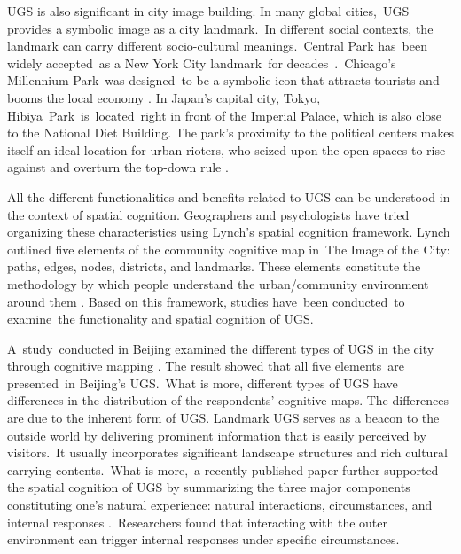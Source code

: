 UGS is also significant in city image building. In many global cities, UGS provides a symbolic image as a city landmark. In different social contexts, the landmark can carry different socio-cultural meanings. Central Park has been widely accepted as a New York City landmark for decades \parencite{rosenzweig_park_1992}. Chicago’s Millennium Park was designed to be a symbolic icon that attracts tourists and booms the local economy \parencite{groos_millennium_2008}. In Japan’s capital city, Tokyo, Hibiya Park is located right in front of the Imperial Palace, which is also close to the National Diet Building. The park’s proximity to the political centers makes itself an ideal location for urban rioters, who seized upon the open spaces to rise against and overturn the top-down rule \parencite{gordon_crowd_1988}.

All the different functionalities and benefits related to UGS can be understood in the context of spatial cognition. Geographers and psychologists have tried organizing these characteristics using Lynch’s spatial cognition framework. Lynch outlined five elements of the community cognitive map in The Image of the City: paths, edges, nodes, districts, and landmarks. These elements constitute the methodology by which people understand the urban/community environment around them \parencite{lynch_image_1960}. Based on this framework, studies have been conducted to examine the functionality and spatial cognition of UGS. 

A study conducted in Beijing examined the different types of UGS in the city through cognitive mapping \parencite{hou_residents_2021}. The result showed that all five elements are presented in Beijing’s UGS. What is more, different types of UGS have differences in the distribution of the respondents’ cognitive maps. The differences are due to the inherent form of UGS. Landmark UGS serves as a beacon to the outside world by delivering prominent information that is easily perceived by visitors. It usually incorporates significant landscape structures and rich cultural carrying contents. What is more, a recently published paper further supported the spatial cognition of UGS by summarizing the three major components constituting one’s natural experience: natural interactions, circumstances, and internal responses \parencite{danrakedzon_framework_2024}. Researchers found that interacting with the outer environment can trigger internal responses under specific circumstances. 

